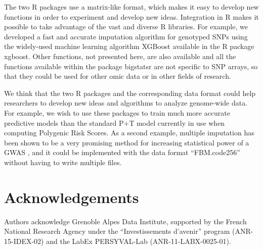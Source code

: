 \documentclass{bioinfo}
\begin{document}
The two R packages use a matrix-like format, which makes it easy to develop new functions in order to experiment and develop new ideas. Integration in R makes it possible to take advantage of the vast and diverse R libraries. For example, we developed a fast and accurate imputation algorithm for genotyped SNPs using the widely-used machine learning algorithm XGBoost available in the R package xgboost. Other functions, not presented here, are also available and all the functions available within the package bigstatsr are not specific to SNP arrays, so that they could be used for other omic data or in other fields of research.

We think that the two R packages and the corresponding data format could help researchers to develop new ideas and algorithms to analyze genome-wide data. For example, we wish to use these packages to train much more accurate predictive models than the standard P+T model currently in use when computing Polygenic Risk Scores. As a second example, multiple imputation has been shown to be a very promising method for increasing statistical power of a GWAS \cite[]{Palmer2016}, and it could be implemented with the data format ``FBM.code256'' without having to write multiple files.


\section*{Acknowledgements}

Authors acknowledge Grenoble Alpes Data Institute, supported by the French National Research Agency under the ``Investissements d'avenir'' program (ANR-15-IDEX-02) and the LabEx PERSYVAL-Lab (ANR-11-LABX-0025-01).

\vspace*{-12pt}



\end{document}
